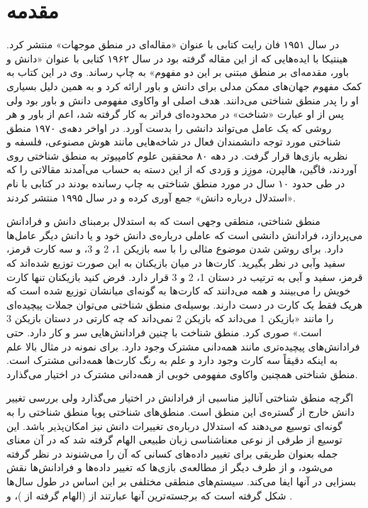 \clearpage
{}
\chapter*{مقدمه}

در سال ۱۹۵۱ فان رایت کتابی با عنوان «مقاله‌ای در منطق موجهات» \citep{Wright1951} منتشر کرد. هینتیکا با ایده‌هایی که از این مقاله گرفته بود در سال ۱۹۶۲ کتابی با عنوان «دانش و باور، مقدمه‌ای بر منطق مبتنی بر این دو مفهوم» \citep{Hintikka1962} به چاپ رساند. وی در این کتاب به کمک مفهوم جهان‌های ممکن مدلی برای دانش و باور ارائه کرد و به همین دلیل بسیاری او را پدر منطق شناختی می‌دانند. هدف اصلی او واکاوی مفهومی دانش و باور بود ولی پس از او عبارت «شناخت» در محدوده‌ای فراتر به کار گرفته شد، اعم از باور و هر روشی که یک عامل می‌تواند دانشی را بدست آورد. در اواخر دهه‌ی ۱۹۷۰ منطق شناختی مورد توجه دانشمندان فعال در شاخه‌هایی مانند هوش مصنوعی، فلسفه و نظریه بازی‌ها قرار گرفت.
در دهه ۸۰ محققین علوم کامپیوتر به منطق شناختی روی آوردند، فاگین، هالپرن، موزِز و وَردی که از این دسته به حساب می‌آمدند مقالاتی را که در طی حدود ۱۰ سال در مورد منطق شناختی به چاپ رسانده بودند در کتابی با نام «استدلال درباره دانش» \citep{RAKFagin1995} جمع آوری کرده و در سال ۱۹۹۵ منتشر کردند.

منطق شناختی، منطقی وجهی است که به استدلال برمبنای دانش و فرادانش می‌پردازد، فرادانش دانشی است که عاملی درباره‌ی دانش خود و یا دانش دیگر عامل‌ها دارد. برای روشن شدن موضوع مثالی را با سه بازیکن 1، 2 و 3، و سه کارت قرمز، سفید وآبی در نظر بگیرید. کارت‌ها در میان بازیکنان به این صورت توزیع شده‌اند که قرمز، سفید و آبی به ترتیب در دستان 1، 2 و 3 قرار دارد. فرض کنید بازیکنان تنها کارت خویش را می‌بینند و همه می‌دانند که کارت‌ها به گونه‌ای میانشان توزبع شده است که هریک فقط یک کارت در دست دارند.  بوسیله‌ی منطق شناختی می‌توان جملات پیچیده‌ای را مانند «بازیکن 1 می‌داند که بازیکن 2 نمی‌داند که چه کارتی در دستان بازیکن 3 است.» صوری کرد. منطق شناخت با چنین فرادانش‌هایی سر و کار دارد. حتی فرادانش‌های پیچیده‌تری مانند همه‌دانی مشترک وجود دارد. برای نمونه در مثال بالا علم به اینکه دقیقاً سه کارت وجود دارد و علم به رنگ کارت‌ها همه‌دانی مشترک است. منطق شناختی همچنین واکاوی مفهومی خوبی از همه‌دانی مشترک در اختیار می‌گذارد.

اگرچه منطق شناختی آنالیز مناسبی از فرادانش در اختیار می‌گذارد ولی بررسی تغییر دانش خارج از گستره‌ی این منطق است. منطق‌های شناختی پویا منطق‌ شناختی را به گونه‌ای توسیع می‌دهند که استدلال درباره‌ی تغییرات دانش نیز امکان‌پذیر باشد. این توسیع از طرفی از نوعی معناشناسی زبان طبیعی الهام گرفته شد که در آن معنای جمله بعنوان طریقی برای تغییر داده‌های کسانی که آن را می‌شنوند در نظر گرفته می‌شود، و از طرف دیگر از مطالعه‌ی بازی‌ها که تغییر داده‌ها و فرادانش‌ها نقش بسزایی در آنها ایفا می‌کند. سیستم‌های منطقی مختلفی بر این اساس در طول سال‌ها شکل گرفته است که برجسته‌ترین آنها عبارتند از \citep{Gerbrandy1997} (الهام گرفته از \citep{Veltman1996})، \citep{Batlag1998} و  \citep{Cate2002}.

